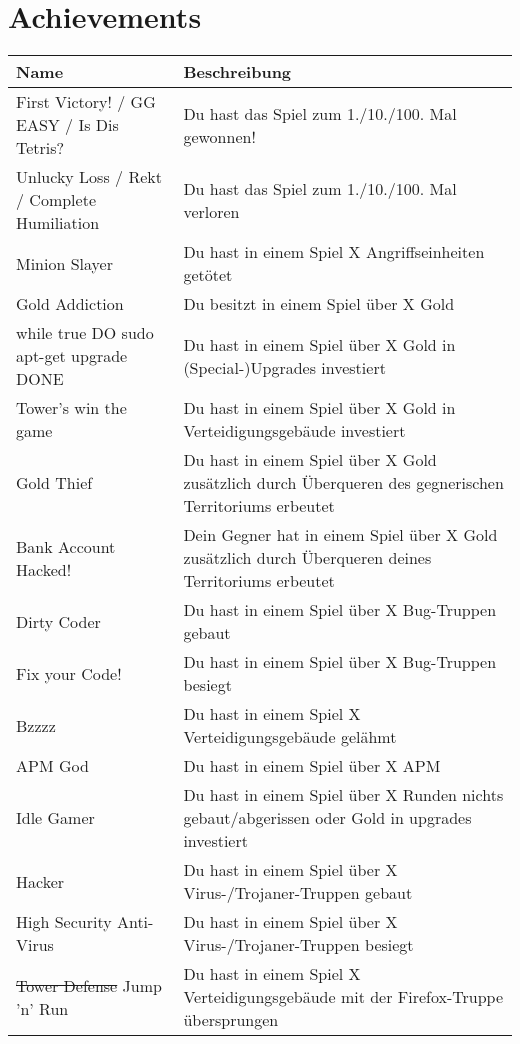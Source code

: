 \section{Achievements}

%


\begin{table}[ht]
  \caption{Achievements}
  \small
  \begin{longtabu}{X[-1]X}
    \toprule\rowfont{\itshape}
    Name & Beschreibung \\
    \midrule\endhead

    First Victory! / GG EASY / Is Dis Tetris?
      & Du hast das Spiel zum 1./10./100. Mal gewonnen!
      	\\
    Unlucky Loss / Rekt / Complete Humiliation
    	& Du hast das Spiel zum 1./10./100. Mal verloren
    	\\
	Minion Slayer
		& Du hast in einem Spiel X Angriffseinheiten getötet
		\\
	Gold Addiction
		& Du besitzt in einem Spiel über X Gold
		\\
	while true DO sudo apt-get upgrade DONE
		& Du hast in einem Spiel über X Gold in (Special-)Upgrades investiert
		\\
	Tower's win the game
		& Du hast in einem Spiel über X Gold in Verteidigungsgebäude investiert
		\\
	Gold Thief
		& Du hast in einem Spiel über X Gold zusätzlich durch Überqueren des gegnerischen
		Territoriums erbeutet
		\\
	Bank Account Hacked!
		& Dein Gegner hat in einem Spiel über X Gold zusätzlich durch Überqueren deines
		Territoriums erbeutet
		\\
	Dirty Coder
		& Du hast in einem Spiel über X Bug-Truppen gebaut
		\\
	Fix your Code!
		& Du hast in einem Spiel über X Bug-Truppen besiegt
		\\
	Bzzzz
		& Du hast in einem Spiel X Verteidigungsgebäude gelähmt
		\\
	APM God
		& Du hast in einem Spiel über X APM
		\\
	Idle Gamer
		& Du hast in einem Spiel über X Runden nichts gebaut/abgerissen oder Gold in upgrades investiert
		\\
	Hacker
		& Du hast in einem Spiel über X Virus-/Trojaner-Truppen gebaut
		\\
	High Security Anti-Virus
		& Du hast in einem Spiel über X Virus-/Trojaner-Truppen besiegt
		\\
	\st{Tower Defense} Jump 'n' Run
		& Du hast in einem Spiel X Verteidigungsgebäude mit der Firefox-Truppe übersprungen
		\\
    \bottomrule
  \end{longtabu}
\end{table}

